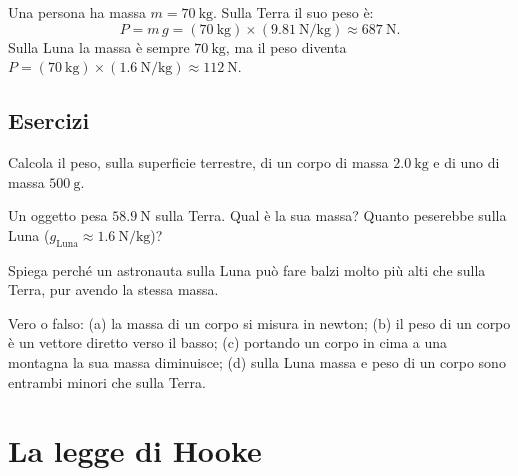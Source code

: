 \begin{testexample}
Una persona ha massa $m = \SI{70}{\kilo\gram}$. Sulla Terra il suo peso è:
\[
P = m\,g = (\SI{70}{\kilo\gram}) \times (\SI{9,81}{\newton\per\kilo\gram}) \approx \SI{687}{\newton}.
\]
Sulla Luna la massa è sempre $\SI{70}{\kilo\gram}$, ma il peso diventa $P = (\SI{70}{\kilo\gram}) \times (\SI{1,6}{\newton\per\kilo\gram}) \approx \SI{112}{\newton}$.
\end{testexample}

\subsection{Esercizi}

\begin{esercizio}
Calcola il peso, sulla superficie terrestre, di un corpo di massa $\SI{2,0}{\kilo\gram}$ e di uno di massa $\SI{500}{\gram}$.\\
\end{esercizio}

\begin{esercizio}
Un oggetto pesa $\SI{58,9}{\newton}$ sulla Terra. Qual è la sua massa? Quanto peserebbe sulla Luna ($g_{\text{Luna}} \approx \SI{1,6}{\newton\per\kilo\gram}$)?\\
\end{esercizio}

\begin{esercizio}
Spiega perché un astronauta sulla Luna può fare balzi molto più alti che sulla Terra, pur avendo la stessa massa.
\end{esercizio}

\begin{esercizio}
Vero o falso: (a) la massa di un corpo si misura in newton; (b) il peso di un corpo è un vettore diretto verso il basso; (c) portando un corpo in cima a una montagna la sua massa diminuisce; (d) sulla Luna massa e peso di un corpo sono entrambi minori che sulla Terra.\\
\end{esercizio}


\section{La legge di Hooke}

